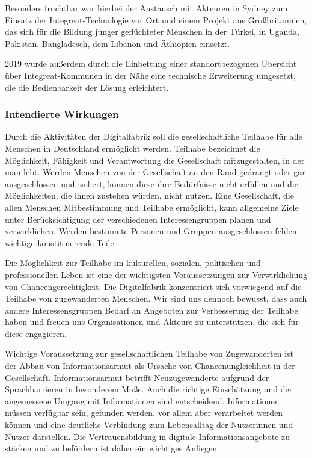 \documentclass[12pt, a4paper]{article} %
\begin{document}
Besonders fruchtbar war hierbei der Austausch mit Akteuren in Sydney zum
Einsatz der Integreat-Technologie vor Ort und einem Projekt aus
Großbritannien, das sich für die Bildung junger geflüchteter Menschen in
der Türkei, in Uganda, Pakistan, Bangladesch, dem Libanon und Äthiopien
einsetzt.

2019 wurde außerdem durch die Einbettung einer standortbezogenen
Übersicht über Integreat-Kommunen in der Nähe eine technische
Erweiterung umgesetzt, die die Bedienbarkeit der Lösung erleichtert.

\hypertarget{intendierte-wirkungen}{%
\subsubsection{Intendierte
Wirkungen}\label{intendierte-wirkungen}}

Durch die Aktivitäten der Digitalfabrik soll die gesellschaftliche
Teilhabe für alle Menschen in Deutschland ermöglicht werden. Teilhabe
bezeichnet die Möglichkeit, Fähigkeit und Verantwortung die Gesellschaft
mitzugestalten, in der man lebt. Werden Menschen von der Gesellschaft an
den Rand gedrängt oder gar ausgeschlossen und isoliert, können diese
ihre Bedürfnisse nicht erfüllen und die Möglichkeiten, die ihnen
zustehen würden, nicht nutzen. Eine Gesellschaft, die allen Menschen
Mitbestimmung und Teilhabe ermöglicht, kann allgemeine Ziele unter
Berücksichtigung der verschiedenen Interessengruppen planen und
verwirklichen. Werden bestimmte Personen und Gruppen ausgeschlossen
fehlen wichtige konstituierende Teile.

Die Möglichkeit zur Teilhabe im kulturellen, sozialen, politischen und
professionellen Leben ist eine der wichtigsten Voraussetzungen zur
Verwirklichung von Chancengerechtigkeit. Die Digitalfabrik konzentriert
sich vorwiegend auf die Teilhabe von zugewanderten Menschen. Wir sind
uns dennoch bewusst, dass auch andere Interessensgruppen Bedarf an
Angeboten zur Verbesserung der Teilhabe haben und freuen uns
Organisationen und Akteure zu unterstützen, die sich für diese
engagieren.

Wichtige Voraussetzung zur gesellschaftlichen Teilhabe von Zugewanderten
ist der Abbau von Informationsarmut als Ursache von Chancenungleichheit
in der Gesellschaft. Informationsarmut betrifft Neuzugewanderte aufgrund
der Sprachbarrieren in besonderem Maße. Auch die richtige Einschätzung
und der angemessene Umgang mit Informationen sind entscheidend.
Informationen müssen verfügbar sein, gefunden werden, vor allem aber
verarbeitet werden können und eine deutliche Verbindung zum Lebensalltag
der Nutzerinnen und Nutzer darstellen. Die Vertrauensbildung in digitale
Informationsangebote zu stärken und zu befördern ist daher ein wichtiges
Anliegen.
\end{document}
